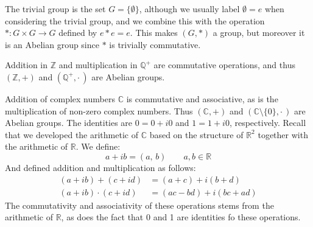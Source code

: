     \begin{example}
        The trivial group is the set $G=\{\emptyset\}$, although we usually
        label $\emptyset=e$ when considering the trivial group, and we combine
        this with the operation $*:G\times{G}\rightarrow{G}$ defined by $e*e=e$.
        This makes $(G,*)$ a group, but moreover it is an Abelian group since
        $*$ is trivially commutative.
    \end{example}
    \begin{example}
        Addition in $\mathbb{Z}$ and multiplication in $\mathbb{Q}^{+}$ are
        commutative operations, and thus $(\mathbb{Z},+)$ and
        $(\mathbb{Q}^{+},\cdot\,)$ are Abelian groups.
    \end{example}
    \begin{example}
        Addition of complex numbers $\mathbb{C}$ is commutative and associative,
        as is the multiplication of non-zero complex numbers. Thus
        $(\mathbb{C},+)$ and $(\mathbb{C}\setminus\{0\},\cdot\,)$ are
        Abelian groups. The identities are $0=0+i0$ and $1=1+i0$, respectively.
        Recall that we developed the arithmetic of $\mathbb{C}$ based on the
        structure of $\mathbb{R}^{2}$ together with the arithmetic of
        $\mathbb{R}$. We define:
        \begin{equation}
            a+ib=(a,\,b)
            \quad\quad
            a,b\in\mathbb{R}
        \end{equation}
        And defined addition and multiplication as follows:
        \begin{subequations}
            \begin{align}
                (a+ib)+(c+id)&=(a+c)+i(b+d)\\
                (a+ib)\cdot(c+id)&=(ac-bd)+i(bc+ad)
            \end{align}
        \end{subequations}
        The commutativity and associativity of these operations stems from the
        arithmetic of $\mathbb{R}$, as does the fact that 0 and 1 are identities
        fo these operations.
    \end{example}
